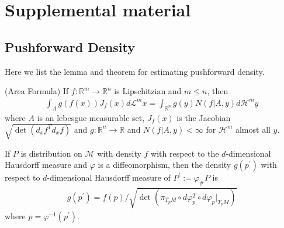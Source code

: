 \section{Supplemental material}
\subsection{Pushforward Density}

Here we list the lemma and theorem for estimating pushforward density.

\begin{lemma}{(Area Formula)}\cite{federer1969geometric}
	\label{lem:area}
	If $f: \mathbb{R}^m \rightarrow \mathbb{R}^n$ is Lipschitzian and $m \leq n$, then
	\begin{align*}
		\int_A g(f(x)) J_f(x) d \mathcal{L}^m x = \int_{\mathbb{R}^n} g(y) N(f|A,y) d\mathcal{H}^m y
	\end{align*}
	where $A$ is an lebesgue measurable set, $J_f(x)$ is the Jacobian $\sqrt{\det(d_x f^T d_x f)}$ and $g: \mathbb{R}^n \rightarrow \mathbb{R}$ and $N(f|A,y) < \infty$ for $\mathcal{H}^m$ almost all $y$.
\end{lemma}


\begin{lemma}
	\label{thm:push_density}
	If $P$ is distribution on $\mathcal{M}$ with density $f$ with respect to the $d$-dimensional Hausdorff measure and $\varphi$ is a diffeomorphism, then the density $g(p^\prime)$ with respect to $d$-dimensional Hausdorff measure of $P^\prime:= \varphi_\# P$ is 
	\begin{align*}
		g(p^\prime)=f(p)/\sqrt{\det \left(\pi_{T_p M} \circ d\varphi_p^T \circ d\varphi_p |_{T_pM}\right)}
	\end{align*}
	where $p=\varphi^{-1}(p^\prime)$. 
\end{lemma}

